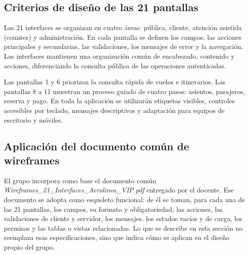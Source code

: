 \documentclass[11pt,a4paper]{article}
\begin{document}
\subsection{Criterios de diseño de las 21 pantallas}
Las 21 interfaces se organizan en cuatro áreas: pública, cliente, atención asistida (counter) y administración. En cada pantalla se definen los campos, las acciones principales y secundarias, las validaciones, los mensajes de error y la navegación. Las interfaces mantienen una organización común de encabezado, contenido y acciones, diferenciando la consulta pública de las operaciones autenticadas.

Las pantallas 1 y 6 priorizan la consulta rápida de vuelos e itinerarios. Las pantallas 8 a 11 muestran un proceso guiado de cuatro pasos: asientos, pasajeros, reserva y pago. En toda la aplicación se utilizarán etiquetas visibles, controles accesibles por teclado, mensajes descriptivos y adaptación para equipos de escritorio y móviles.

\subsection{Aplicación del documento común de wireframes}
El grupo incorpora como base el documento común \textit{Wireframes\_21\_Interfaces\_Aerolinea\_VIP.pdf} entregado por el docente. Ese documento se adopta como esqueleto funcional: de él se toman, para cada una de las 21 pantallas, los campos, su formato y obligatoriedad, las acciones, las validaciones de cliente y servidor, los mensajes, los estados vacíos y de carga, los permisos y las tablas o vistas relacionadas. Lo que se describe en esta sección no reemplaza esas especificaciones, sino que indica cómo se aplican en el diseño propio del grupo.
\end{document}
